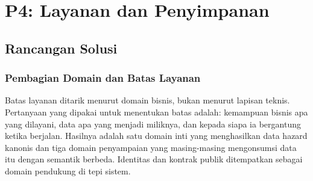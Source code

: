 \chapter{P4: Layanan dan Penyimpanan}
\label{chap:p4}

\section{Rancangan Solusi}

\subsection{Pembagian Domain dan Batas Layanan}

Batas layanan ditarik menurut domain bisnis, bukan menurut lapisan teknis.
Pertanyaan yang dipakai untuk menentukan batas adalah: kemampuan bisnis apa
yang dilayani, data apa yang menjadi miliknya, dan kepada siapa ia bergantung
ketika berjalan. Hasilnya adalah satu domain inti yang menghasilkan data hazard
kanonis dan tiga domain penyampaian yang masing-masing mengonsumsi data itu
dengan semantik berbeda. Identitas dan kontrak publik ditempatkan sebagai
domain pendukung di tepi sistem.

